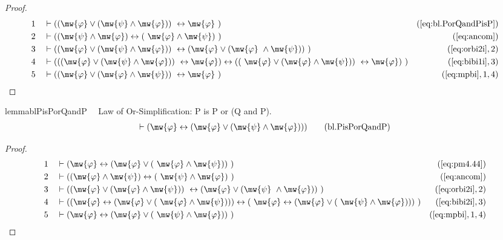 \begin{proof}
\begin{align}
  1 &&  & \vdash ( ( \mw{\varphi} \vee ( \mw{\psi} \wedge \mw{\varphi} ) )
     ~\leftrightarrow \mw{\varphi}
     ~)&(\mbox{\ref{eq:bl.PorQandPisP}})\notag
  \\ 2 &&  & \vdash ( ( \mw{\psi} \wedge \mw{\varphi} ) \leftrightarrow (
     ~\mw{\varphi} \wedge \mw{\psi} )
     ~)&(\mbox{\ref{eq:ancom}})\notag
  \\ 3 &&  & \vdash ( ( \mw{\varphi} \vee ( \mw{\psi} \wedge \mw{\varphi} ) )
     ~\leftrightarrow ( \mw{\varphi} \vee ( \mw{\varphi}
     ~\wedge \mw{\psi} ) )
     ~)&(\mbox{\ref{eq:orbi2i}},2)\notag
  \\ 4 &&  & \vdash ( ( ( \mw{\varphi} \vee ( \mw{\psi} \wedge \mw{\varphi} ) )
     ~\leftrightarrow \mw{\varphi} ) \leftrightarrow ( (
     ~\mw{\varphi} \vee ( \mw{\varphi} \wedge \mw{\psi} ) )
     ~\leftrightarrow \mw{\varphi} )
     ~)&(\mbox{\ref{eq:bibi1i}},3)\notag
  \\ 5 &&  & \vdash ( ( \mw{\varphi} \vee ( \mw{\varphi} \wedge \mw{\psi} ) )
     ~\leftrightarrow \mw{\varphi}
     ~)&(\mbox{\ref{eq:mpbi}},1,4)\notag
\end{align}
\end{proof}

\begin{restatable}{lemma}{blPisPorQandP}~~ Law of Or-Simplification: P is P or
(Q and P).
\begin{align}
\vdash ( \mw{\varphi} \leftrightarrow ( \mw{\varphi} \vee ( \mw{\psi} \wedge
    \mw{\varphi} ) ) )\label{eq:bl.PisPorQandP}\tag{bl.PisPorQandP}
\end{align}
\end{restatable}

\begin{proof}
\begin{align}
  1 &&  & \vdash ( \mw{\varphi} \leftrightarrow ( \mw{\varphi} \vee (
     ~\mw{\varphi} \wedge \mw{\psi} ) )
     ~)&(\mbox{\ref{eq:pm4.44}})\notag
  \\ 2 &&  & \vdash ( ( \mw{\varphi} \wedge \mw{\psi} ) \leftrightarrow (
     ~\mw{\psi} \wedge \mw{\varphi} )
     ~)&(\mbox{\ref{eq:ancom}})\notag
  \\ 3 &&  & \vdash ( ( \mw{\varphi} \vee ( \mw{\varphi} \wedge \mw{\psi} ) )
     ~\leftrightarrow ( \mw{\varphi} \vee ( \mw{\psi}
     ~\wedge \mw{\varphi} ) )
     ~)&(\mbox{\ref{eq:orbi2i}},2)\notag
  \\ 4 &&  & \vdash ( ( \mw{\varphi} \leftrightarrow ( \mw{\varphi} \vee (
     ~\mw{\varphi} \wedge \mw{\psi} ) ) ) \leftrightarrow (
     ~\mw{\varphi} \leftrightarrow ( \mw{\varphi} \vee (
     ~\mw{\psi} \wedge \mw{\varphi} ) ) )
     ~)&(\mbox{\ref{eq:bibi2i}},3)\notag
  \\ 5 &&  & \vdash ( \mw{\varphi} \leftrightarrow ( \mw{\varphi} \vee (
     ~\mw{\psi} \wedge \mw{\varphi} ) )
     ~)&(\mbox{\ref{eq:mpbi}},1,4)\notag
\end{align}
\end{proof}

